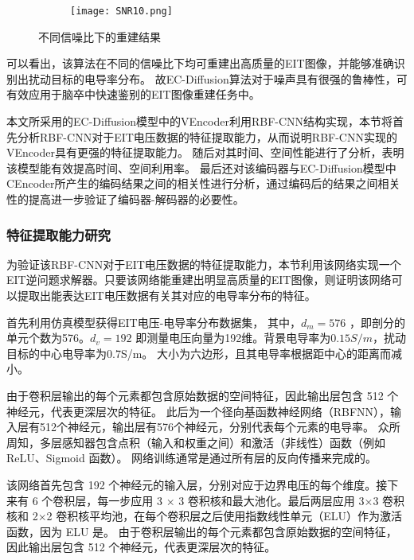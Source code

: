 \newcommand{\subfiggggg}{
\begin{subfigure}[b]{0.8\linewidth}
\centering
\texttt{[image: SNR10.png]}
\subcaption{信噪比为10时的重建结果}
\end{subfigure}
\label{subfigure:SNR30}
}

\begin{figure}[H]
    \subfigg
    \subfiggg
    \subfigggg
    \subfiggggg
    \caption{不同信噪比下的重建结果}
    \label{fig:SNR}
\end{figure}

可以看出，该算法在不同的信噪比下均可重建出高质量的EIT图像，并能够准确识别出扰动目标的电导率分布。
故EC-Diffusion算法对于噪声具有很强的鲁棒性，可有效应用于脑卒中快速鉴别的EIT图像重建任务中。


本文所采用的EC-Diffusion模型中的VEncoder利用RBF-CNN结构实现，本节将首先分析RBF-CNN对于EIT电压数据的特征提取能力，从而说明RBF-CNN实现的VEncoder具有更强的特征提取能力。
随后对其时间、空间性能进行了分析，表明该模型能有效提高时间、空间利用率。
最后还对该编码器与EC-Diffusion模型中CEncoder所产生的编码结果之间的相关性进行分析，通过编码后的结果之间相关性的提高进一步验证了编码器-解码器的必要性。

\subsubsection{特征提取能力研究}

为验证该RBF-CNN对于EIT电压数据的特征提取能力，本节利用该网络实现一个EIT逆问题求解器。只要该网络能重建出明显高质量的EIT图像，则证明该网络可以提取出能表达EIT电压数据有关其对应的电导率分布的特征。

首先利用仿真模型获得EIT电压-电导率分布数据集，
其中，$d_m =  576$ ，即剖分的单元个数为576。$d_v = 192$ 即测量电压向量为192维。背景电导率为$0.15S/m$，扰动目标的中心电导率为0.7S/m。
大小为六边形，且其电导率根据距中心的距离而减小。


由于卷积层输出的每个元素都包含原始数据的空间特征，因此输出层包含 512 个神经元，代表更深层次的特征。
此后为一个径向基函数神经网络（RBFNN），输入层有512个神经元，输出层有576个神经元，分别代表每个元素的电导率。
众所周知，多层感知器包含点积（输入和权重之间）和激活（非线性）函数（例如 ReLU、Sigmoid 函数）。
网络训练通常是通过所有层的反向传播来完成的。

该网络首先包含 192 个神经元的输入层，分别对应于边界电压的每个维度。接下来有 6 个卷积层，每一步应用 3 × 3 卷积核和最大池化。最后两层应用 3×3 卷积核和 2×2 卷积核平均池，在每个卷积层之后使用指数线性单元（ELU）作为激活函数，因为 ELU 是。
由于卷积层输出的每个元素都包含原始数据的空间特征，因此输出层包含 512 个神经元，代表更深层次的特征。

